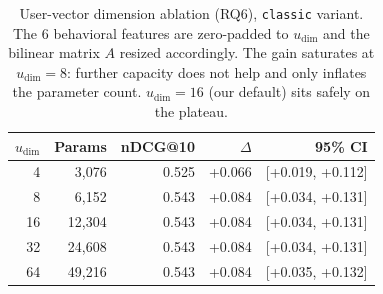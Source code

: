 \begin{table}[t]
\centering
\caption{User-vector dimension ablation (RQ6), \texttt{classic} variant. The 6 behavioral features are zero-padded to $u_{\dim}$ and the bilinear matrix $A$ resized accordingly. The gain saturates at $u_{\dim}{=}8$: further capacity does not help and only inflates the parameter count. $u_{\dim}{=}16$ (our default) sits safely on the plateau.}
\label{tab:dim}
\begin{tabular}{rrrrr}
\toprule
$u_{\dim}$ & Params & nDCG@10 & $\Delta$ & 95\% CI \\
\midrule
4  & 3{,}076  & 0.525 & +0.066 & [+0.019, +0.112] \\
8  & 6{,}152  & 0.543 & +0.084 & [+0.034, +0.131] \\
16 & 12{,}304 & 0.543 & +0.084 & [+0.034, +0.131] \\
32 & 24{,}608 & 0.543 & +0.084 & [+0.034, +0.131] \\
64 & 49{,}216 & 0.543 & +0.084 & [+0.035, +0.132] \\
\bottomrule
\end{tabular}
\end{table}
